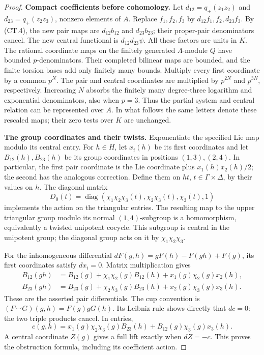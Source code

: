\documentclass[11pt,a4paper]{article}
\theoremstyle{definition}
\begin{document}
\begin{proof}
\par\medskip\noindent\textbf{Compact coefficients before cohomology.}
Let \(d_{12}=q_+(z_1z_2)\) and \(d_{23}=q_+(z_2z_3)\), nonzero
elements of \(A\). Replace \(f_1,f_2,f_3\) by
\(d_{12}f_1,f_2,d_{23}f_3\). By (CT.4), the new pair maps are
\(d_{12}b_{12}\) and \(d_{23}b_{23}\); their proper-pair
denominators cancel. The new central functional is
\(d_{12}d_{23}\psi\). All these factors are units in \(K\).
The rational coordinate maps on the finitely generated
\(\Lambda\)-module \(Q\) have bounded \(p\)-denominators.
Their completed bilinear maps are bounded, and the finite torsion
bases add only finitely many bounds. Multiply every first coordinate
by a common \(p^N\). The pair and central coordinates are multiplied
by \(p^{2N}\) and \(p^{3N}\), respectively. Increasing \(N\)
absorbs the finitely many degree-three logarithm and exponential
denominators, also when \(p=3\). Thus the partial system and central
relation can be represented over \(A\). In what follows the same
letters denote these rescaled maps; their zero tests over \(K\)
are unchanged.

\par\medskip\noindent\textbf{The group coordinates and their twists.}
Exponentiate the specified Lie map modulo its central entry. For
\(h\in H\), let \(x_i(h)\) be its first coordinates and let
\(B_{12}(h),B_{23}(h)\) be its group coordinates in positions
\((1,3),(2,4)\). In particular, the first pair coordinate is the
Lie coordinate plus \(x_1(h)x_2(h)/2\); the second has the
analogous correction. Define them on \(h t\),
\(t\in\Gamma\times\Delta\), by their values on \(h\).
The diagonal matrix
\[
 D_0(t)=\operatorname{diag}
   (\chi_1\chi_2\chi_3(t),\chi_2\chi_3(t),\chi_3(t),1)
\]
implements the action on the triangular entries. The resulting
map to the upper triangular group modulo its normal
\((1,4)\)-subgroup is a homomorphism, equivalently a twisted
unipotent cocycle. This subgroup is central in the unipotent
group; the diagonal group acts on it by
\(\chi_1\chi_2\chi_3\).

For the inhomogeneous differential
\(dF(g,h)=gF(h)-F(gh)+F(g)\), its first coordinates satisfy
\(dx_i=0\). Matrix multiplication gives
\[
 \begin{split}
 B_{12}(gh)&=B_{12}(g)+\chi_1\chi_2(g)B_{12}(h)
                      +x_1(g)\chi_2(g)x_2(h),\\
 B_{23}(gh)&=B_{23}(g)+\chi_2\chi_3(g)B_{23}(h)
                      +x_2(g)\chi_3(g)x_3(h).
 \end{split}
 \tag{CT.11}
\]
These are the asserted pair differentials. The cup convention is
\((F\smile G)(g,h)=F(g)gG(h)\). Its Leibniz rule shows directly
that \(dc=0\): the two triple products cancel. In entries,
\[
 c(g,h)=x_1(g)\chi_2\chi_3(g)B_{23}(h)
              +B_{12}(g)\chi_3(g)x_3(h).
 \tag{CT.12}
\]
A central coordinate \(Z(g)\) gives a full lift exactly when
\(dZ=-c\). This proves the obstruction formula, including its
coefficient action.


\end{proof}
\end{document}
